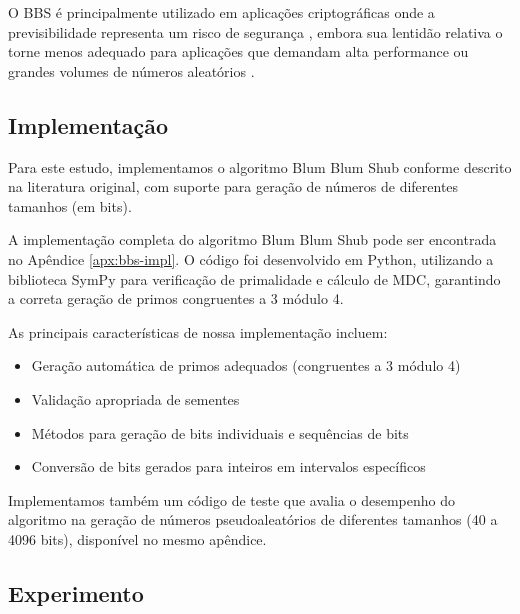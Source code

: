 O BBS é principalmente utilizado em aplicações criptográficas onde a previsibilidade representa um risco de segurança \cite{vassilev2016entropy}, embora sua lentidão relativa o torne menos adequado para aplicações que demandam alta performance ou grandes volumes de números aleatórios \cite{koblitz2015riddle}.

\subsection{Implementação}

Para este estudo, implementamos o algoritmo Blum Blum Shub conforme descrito na literatura original, com suporte para geração de números de diferentes tamanhos (em bits).

A implementação completa do algoritmo Blum Blum Shub pode ser encontrada no Apêndice \ref{apx:bbs-impl}. O código foi desenvolvido em Python, utilizando a biblioteca SymPy para verificação de primalidade e cálculo de MDC, garantindo a correta geração de primos congruentes a 3 módulo 4.

As principais características de nossa implementação incluem:
\begin{itemize}
    \item Geração automática de primos adequados (congruentes a 3 módulo 4)
    \item Validação apropriada de sementes
    \item Métodos para geração de bits individuais e sequências de bits
    \item Conversão de bits gerados para inteiros em intervalos específicos
\end{itemize}

Implementamos também um código de teste que avalia o desempenho do algoritmo na geração de números pseudoaleatórios de diferentes tamanhos (40 a 4096 bits), disponível no mesmo apêndice.

\subsection{Experimento}


